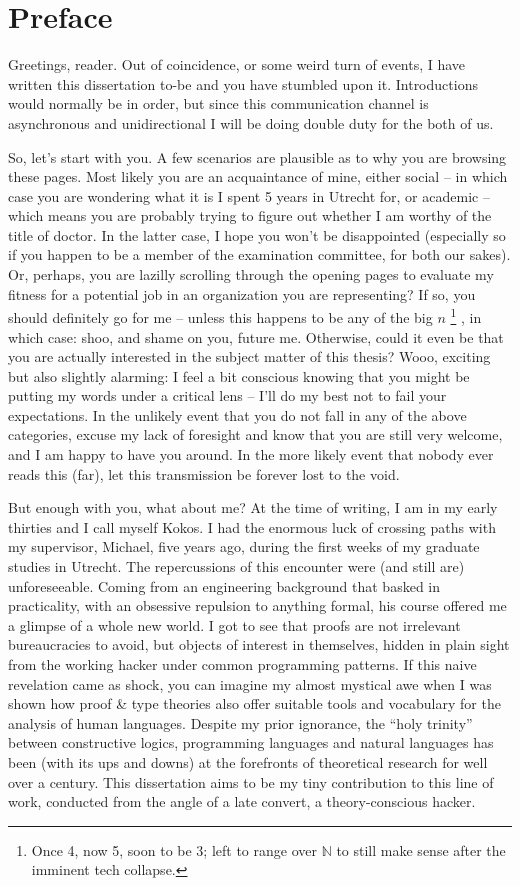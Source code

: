 \chapter*{Preface}

Greetings, reader. Out of coincidence, or some weird turn of events, I have written this dissertation to-be and you have stumbled upon it.
Introductions would normally be in order, but since this communication channel is asynchronous and unidirectional I will be doing double duty for the both of us.

So, let's start with you. 
A few scenarios are plausible as to why you are browsing these pages. 
Most likely you are an acquaintance of mine, either social – in which case you are wondering what it is I spent 5 years in Utrecht for, or academic – which means you are probably trying to figure out whether I am worthy of the title of doctor. 
In the latter case, I hope you won’t be disappointed (especially so if you happen to be a member of the examination committee, for both our sakes).
Or, perhaps, you are lazilly scrolling through the opening pages to evaluate my fitness for a potential job in an organization you are representing? 
If so, you should definitely go for me – unless this happens to be any of the big $n$%
	\footnote{Once 4, now 5, soon to be 3; left to range over $\mathbb{N}$ to still make sense after the imminent tech collapse.}
, in which case: shoo, and shame on you, future me.
Otherwise, could it even be that you are actually interested in the subject matter of this thesis? 
Wooo, exciting but also slightly alarming: I feel a bit conscious knowing that you might be putting my words under a critical lens – I’ll do my best not to fail your expectations. 
In the unlikely event that you do not fall in any of the above categories, excuse my lack of foresight and know that you are still very welcome, and I am happy to have you around. 
In the more likely event that nobody ever reads this (far), let this transmission be forever lost to the void.

But enough with you, what about me? 
At the time of writing, I am in my early thirties and I call myself Kokos. 
I had the enormous luck of crossing paths with my supervisor, Michael, five years ago, during the first weeks of my graduate studies in Utrecht. 
The repercussions of this encounter were (and still are) unforeseeable. 
Coming from an engineering background that basked in practicality, with an obsessive repulsion to anything formal, his course offered me a glimpse of a whole new world. 
I got to see that proofs are not irrelevant bureaucracies to avoid, but objects of interest in themselves, hidden in plain sight from the working hacker under common programming patterns. 
If this naive revelation came as shock, you can imagine my almost mystical awe when I was shown how proof \& type theories also offer suitable tools and vocabulary for the analysis of human languages. 
Despite my prior ignorance, the “holy trinity” between constructive logics, programming languages and natural languages has been (with its ups and downs) at the forefronts of theoretical research for well over a century. 
This dissertation aims to be my tiny contribution to this line of work, conducted from the angle of a late convert, a theory-conscious hacker. 

